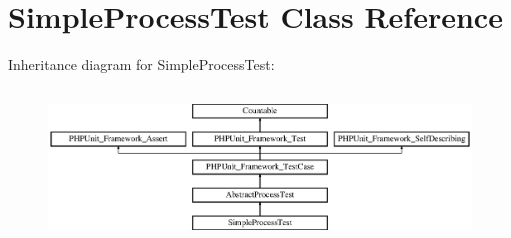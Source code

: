 \section{Simple\+Process\+Test Class Reference}
\label{class_symfony_1_1_component_1_1_process_1_1_tests_1_1_simple_process_test}
Inheritance diagram for Simple\+Process\+Test\+:\begin{figure}[H]
\begin{center}
\leavevmode
\includegraphics[height=4.129793cm]{class_symfony_1_1_component_1_1_process_1_1_tests_1_1_simple_process_test}
\end{center}
\end{figure}
